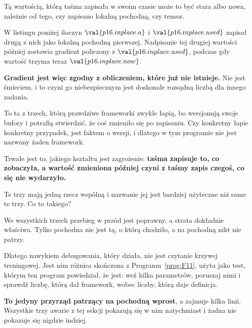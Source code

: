 \begin{fr}
\begin{ansblock}
Tą wartością, którą taśma zapisała w swoim czasie \dash{} może to być stara
albo nowa, zależnie od tego, czy zapisano lokalną pochodną, czy tensor.
\end{ansblock}

W listingu poniżej iloczyn $\val{p16.inplace.a}$ i
$\val{p16.inplace.used}$ zapisał drugą z nich jako lokalną pochodną
pierwszej. Nadpisanie tej drugiej wartości później zostawia gradient policzony
z $\val{p16.inplace.used}$, podczas gdy wartość trzyma teraz
$\val{p16.inplace.now}$.


\textbf{Gradient jest więc zgodny z obliczeniem, które już nie istnieje.} Nie
jest śmieciem, i to czyni go niebezpiecznym \dash{} jest doskonale rozsądną
liczbą dla innego zadania.

\begin{note}
To ta z trzech, którą prawdziwe frameworki zwykle łapią, bo wersjonują swoje
bufory i potrafią stwierdzić, że coś zmieniło się po zapisaniu. Czy konkretny
łapie konkretny przypadek, jest faktem o wersji, i dlatego w tym programie nie
jest nazwany żaden framework.

Trwałe jest to, jakiego kształtu jest zagrożenie: \textbf{taśma zapisuje to, co
zobaczyła, a wartość zmieniona później czyni z taśmy zapis czegoś, co się nie
wydarzyło.}
\end{note}
\end{fr}

\begin{fr}
Te trzy mają jedną rzecz wspólną i nazwanie jej jest bardziej użyteczne niż
same te trzy. Co to takiego?
\dotline
\nextframe
\end{fr}

\begin{fr}
\begin{ansblock}
We wszystkich trzech przebieg w przód jest poprawny, a strata dokładnie
właściwa. Tylko pochodna nie jest tą, o którą chodziło, a na pochodną nikt nie
patrzy.
\end{ansblock}

Dlatego nawykiem debugowania, który działa, nie jest czytanie krzywej
treningowej. Jest nim różnica skończona z Programu~\ref{prog:F11}, użyta jako
test, którym ten program powiedział, że jest: weź kilka parametrów, poruszaj
nimi i sprawdź liczbę, którą dał framework, wobec liczby, którą daje definicja.

\textbf{To jedyny przyrząd patrzący na pochodną wprost}, a zajmuje kilka linii.
Wszystkie trzy awarie z tej sekcji pokazują się w nim natychmiast i żadna nie
pokazuje się nigdzie indziej.
\end{fr}

